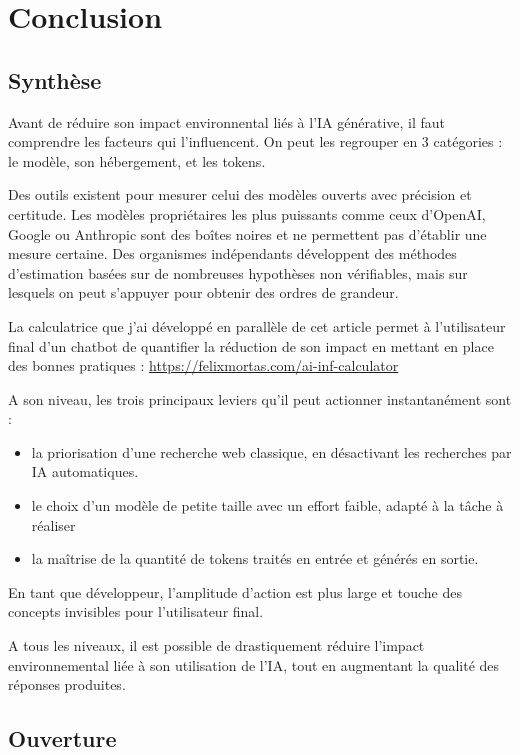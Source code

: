 \section{Conclusion}\label{conclusion}

\subsection{Synthèse}\label{synthuxe8se}
Avant de réduire son impact environnental liés à l'IA générative, il faut comprendre les facteurs qui l'influencent.
On peut les regrouper en 3 catégories : le modèle, son hébergement, et les tokens.

Des outils existent pour mesurer celui des modèles ouverts avec précision et certitude.
Les modèles propriétaires les plus puissants comme ceux d'OpenAI, Google ou Anthropic sont des boîtes noires et ne permettent pas d'établir une mesure certaine. 
Des organismes indépendants développent des méthodes d'estimation basées sur de nombreuses hypothèses non vérifiables, mais sur lesquels on peut s'appuyer pour obtenir des ordres de grandeur.

La calculatrice que j'ai développé en parallèle de cet article permet à l'utilisateur final d'un chatbot de quantifier la réduction de son impact en mettant en place des bonnes pratiques : \url{https://felixmortas.com/ai-inf-calculator}

A son niveau, les trois principaux leviers qu'il peut actionner instantanément sont :
\begin{itemize}
    \item la priorisation d'une recherche web classique, en désactivant les recherches par IA automatiques.
    \item le choix d'un modèle de petite taille avec un effort faible, adapté à la tâche à réaliser
    \item la maîtrise de la quantité de tokens traités en entrée et générés en sortie.
\end{itemize}

En tant que développeur, l'amplitude d'action est plus large et touche des concepts invisibles pour l'utilisateur final. 

A tous les niveaux, il est possible de drastiquement réduire l'impact environnemental liée à son utilisation de l'IA, tout en augmentant la qualité des réponses produites.

\subsection{Ouverture}

